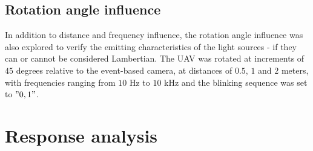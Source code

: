 \subsection{Rotation angle influence}

In addition to distance and frequency influence, the rotation angle influence was also explored to
verify the emitting characteristics of the light sources - if they can or cannot be considered Lambertian.
The \ac{UAV} was rotated at increments of $45$ degrees relative to the event-based camera, at distances of $0.5$, $1$ and $2$ meters,
with frequencies ranging from $10$ Hz to $10$ kHz and the blinking sequence was set to $"0, 1"$.




\section{Response analysis}

